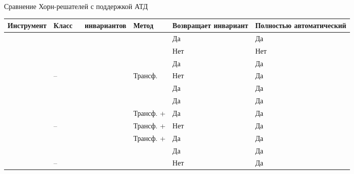 \begin{frame}{Сравнение Хорн-решателей с поддержкой АТД}
\begin{table}
\centering\footnotesize
\begin{tabular}{| m{38mm} || x{18mm} | x{18mm} | x{18mm} | x{23mm} |}
\hline
Инструмент & Класс\quad\ \ \  инвариантов & Метод & Возвращает инвариант & Полностью автоматический\\\hline\hline
\spacer{} & \elemclass{} & \pdr{} & Да & Да\\
\racer{} & \catelemclass{} & \pdr{} & Нет & Нет\\
\eldarica{} & \sizeelemclass{} & \cegar{} & Да & Да\\
\vericat{} & -- & Трансф. & Нет & Да\\
\hoice{} & \elemclass{} & \ice{} & Да & Да\\
\rchc{}  & \syncRegFlatClass{} & \ice{} & Да & Да\\\hline
\ringen{\cvc} & \regclass{} & Трансф. + \fmf{} & Да & Да\\
\ringen{\vampire} & -- & Трансф. + \satur{} & Нет & Да\\
\ringenSync{} & \syncRegFullClass{} & Трансф. + \fmf{} & Да & Да\\
\ringenCICI{\cvc} & \regelemclass{} & \ourCEGAR{} & Да & Да\\
\ringenCICI{\vampire} & -- & \ourCEGAR{} & Нет & Да\\
\hline
\end{tabular}
\end{table}
\end{frame}


